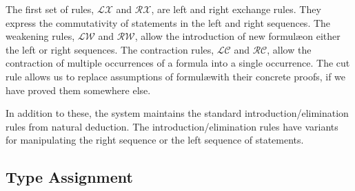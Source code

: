   
  The first set of rules, $\mathcal{LX}$ and $\mathcal{RX}$, are left and right exchange rules. 
  They express the commutativity of statements in the left and right sequences.
  The weakening rules, $\mathcal{LW}$ and $\mathcal{RW}$, allow the introduction of new formul\ae on either the left or right sequences.
  The contraction rules, $\mathcal{LC}$ and $\mathcal{RC}$, allow the contraction of multiple occurrences of a formula into a single occurrence. 
  The cut rule allows us to replace assumptions of formul\ae with their concrete proofs, if we have proved them somewhere else.
  
  In addition to these, the system maintains the standard introduction/elimination rules from natural deduction.
  The introduction/elimination rules have variants for manipulating the right sequence or the left sequence of statements.
  
  \subsection{Type Assignment}\label{sec:type-assignment}
  
